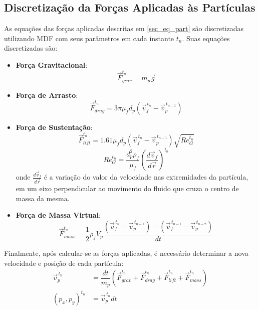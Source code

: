 \subsection{\textbf{Discretização da Forças Aplicadas às Partículas}}
As equações das forças aplicadas descritas em \ref{sec_eq_part} são discretizadas utilizando MDF com seus parâmetros em cada instante $t_n$.
Suas equações discretizadas são:
\begin{itemize}
    \item \textbf{Força Gravitacional}:
        \begin{equation}
            \vec{F}_{grav}^{t_n} = m_p \vec{g}
            \label{grav_discret}
        \end{equation}

    \item \textbf{Força de Arrasto}:
        \begin{equation}
            \vec{F}_{drag}^{t_n} = 3 \pi \mu_f d_p \left(\vec{v}_{f}^{\,t_n} - \vec{v}_{p}^{\,t_{n-1}} \right)
            \label{drag_discret}
        \end{equation}

    \item \textbf{Força de Sustentação}:
        \begin{equation}
            \vec{F}_{lift}^{t_n} = 1.61 \mu_f d_p \left(\vec{v}_{f}^{\,t_n} - \vec{v}_{p}^{\,t_{n-1}} \right) \sqrt{{Re}_G^{t_n}}
            \label{lift_discret}
        \end{equation}
        \begin{equation}
            Re_G^{t_n} = \dfrac{d_p^2 \rho_f}{\mu_f} \left( \dfrac{d\vec{v}_f}{d\vec{r}} \right)^{t_n}
            \label{reg_discret}
        \end{equation}
        onde $\tfrac{d\vec{v}_f}{d\vec{r}}$ é a variação do valor da velocidade nas extremidades da partícula, em um eixo perpendicular ao movimento do fluido que cruza o centro de massa da mesma.

    \item \textbf{Força de Massa Virtual}:
        \begin{equation}
            \vec{F}_{mass}^{t_n} = \dfrac{1}{2} \rho_f V_p \dfrac{\left(\vec{v}_{f}^{\,t_n} - \vec{v}_{p}^{\,t_{n-1}}\right) -
            \left(\vec{v}_{f}^{\,t_{n-1}} - \vec{v}_{p}^{\,t_{n-2}} \right)}{dt}
            \label{mass_discret}
        \end{equation}
\end{itemize}

Finalmente, após calcular-se as forças aplicadas, é necessário determinar a nova velocidade e posição de cada partícula:
\begin{align}
    \vec{v}_p^{\,t_n} &= \dfrac{dt}{m_p} \left(\vec{F}_{grav}^{t_n} + \vec{F}_{drag}^{t_n} + \vec{F}_{lift}^{t_n} +\vec{F}_{mass}^{t_n} \right)
    \label{vel_discret} \\
    (p_x, p_y)^{t_n} &= \vec{v}_p^{\,t_n} dt
    \label{pos_discret}
\end{align}